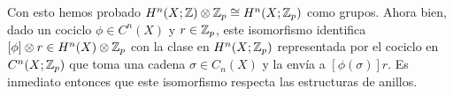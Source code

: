 \documentclass[twoside]{article}
\begin{document}
\begin{solucion}
Con esto hemos probado $H^n(X;\mathbb{Z})\otimes \mathbb{Z}_p\cong H^n(X;\mathbb{Z}_p)$ como grupos. Ahora bien, dado un cociclo  $\phi\in C^n(X)$ y $r\in \mathbb{Z}_p$, este isomorfismo identifica $[\phi]\otimes r\in H^n(X)\otimes \mathbb{Z}_p$ con la clase en $H^n(X;\mathbb{Z}_p)$ representada por el cociclo en $C^n(X;\mathbb{Z}_p)$ que toma una cadena $\sigma\in C_n(X)$ y la envía a $[\phi(\sigma)]r$. Es inmediato entonces que este isomorfismo respecta las estructuras de anillos.




%
%
\end{solucion}

\newpage
\end{document}
